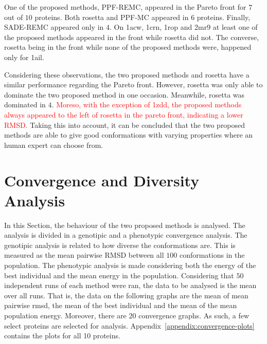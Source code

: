 One of the proposed methods, PPF-REMC, appeared in the Pareto front for $7$ out of 
$10$ proteins. Both rosetta and PPF-MC appeared in $6$ proteins. Finally,
SADE-REMC appeared only in $4$. On 1acw, 1crn, 1rop and 2mr9 at least one of the
proposed methods appeared in the front while rosetta did not. The converse,
rosetta being in the front while none of the proposed methods were, happened
only for 1ail.

Considering these observations, the two proposed methods and rosetta have a
similar performance regarding the Pareto front. However, rosetta was only
able to dominate the two proposed method in one occasion. Meanwhile, rosetta was
dominated in $4$.
\textcolor{red}{
Moreso, with the exception of 1zdd, the proposed methods
always appeared to the left of rosetta in the pareto front, indicating
a lower RMSD.
}
Taking this into account, it can be concluded that the two
proposed methods are able to give good conformations with varying properties
where an human expert can choose from.

\section{Convergence and Diversity Analysis}
\label{sec:convergence-analysis}

In this Section, the behaviour of the two proposed methods is analysed. The
analysis is divided in a genotipic and a phenotypic convergence analysis. The
genotipic analysis is related to how diverse the conformations are. This is
measured as the mean pairwise RMSD between all $100$ conformations in the
population. The phenotypic analysis is made considering both the energy of
the best individual and the mean energy in the population. Considering that
$50$ independent runs of each method were ran, the data to be analysed is
the mean over all runs. That is, the data on the following graphs are
the mean of mean pairwise rmsd, the mean of the best individual and the mean
of the mean population energy. Moreover, there are $20$ convergence graphs. As such,
a few select proteins are selected for analysis.
Appendix~\ref{appendix:convergence-plots} contains the plots for all 10
proteins.

